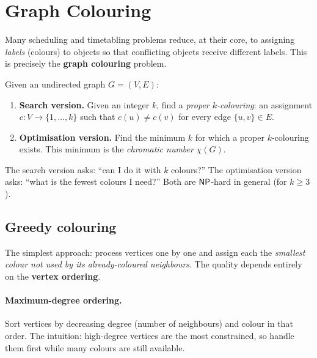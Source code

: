 
\section{Graph Colouring}
\label{sec:graph-colouring}

Many scheduling and timetabling problems reduce, at their core,
to assigning \emph{labels} (colours) to objects so that
conflicting objects receive different labels.  This is precisely
the \textbf{graph colouring} problem.%

\begin{definition}
\label{def:graph-colouring}
Given an undirected graph $G = (V, E)$:
\begin{enumerate}[nosep]
  \item \textbf{Search version.}
    Given an integer $k$, find a \emph{proper $k$-colouring}:
    an assignment $c\colon V \to \{1,\dots,k\}$ such that
    $c(u) \neq c(v)$ for every edge $\{u,v\} \in E$.
  \item \textbf{Optimisation version.}
    Find the minimum $k$ for which a proper $k$-colouring exists.
    This minimum is the \emph{chromatic number} $\chi(G)$.
\end{enumerate}
\end{definition}

The search version asks: ``can I do it with $k$ colours?''
The optimisation version asks: ``what is the fewest colours I
need?''  Both are $\mathsf{NP}$-hard in general (for $k \ge 3$).

\subsection{Greedy colouring}
\label{ssec:greedy-colouring}

The simplest approach: process vertices one by one and assign each
the \emph{smallest colour not used by its already-coloured
neighbours}.  The quality depends entirely on the \textbf{vertex
ordering}.

\paragraph{Maximum-degree ordering.}
Sort vertices by decreasing degree (number of neighbours) and
colour in that order.  The intuition: high-degree vertices are
the most constrained, so handle them first while many colours
are still available.

